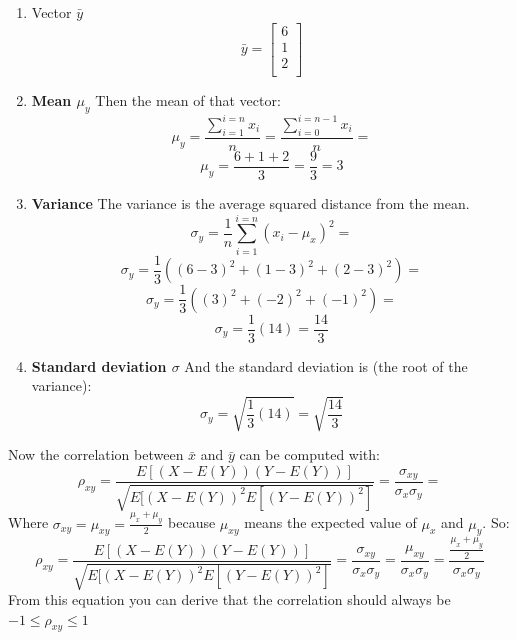 \begin{enumerate}
    \item Vector $\bar{y}$
        \begin{equation}
            \bar{y}=
            \begin{bmatrix}
            6\\
            1\\
            2\\
            \end{bmatrix}
        \end{equation}
    \item \textbf{Mean $\mu_y$}
        Then the mean of that vector:
        \begin{equation}
            \mu_y =\frac{\sum_{i=1}^{i=n}{x_i}}{n}= \frac{\sum_{i=0}^{i=n-1}{x_i}}{n}=
        \end{equation}
        \begin{equation}
            \mu_y=\frac{6+1+2}{3}=\frac{9}{3}=3
        \end{equation}
    \item \textbf{Variance}
        The variance is the average squared distance from the mean.
        \begin{equation}
            \sigma_y=\frac{1}{n}\sum_{i=1}^{i=n}{({x_i}-\mu_x)}^2=
        \end{equation}
        \begin{equation}
            \sigma_y=\frac{1}{3}({(6-3)}^2+{(1-3)}^2+{(2-3)}^2)=
        \end{equation}
        \begin{equation}
            \sigma_y=\frac{1}{3}({(3)}^2+{(-2)}^2+{(-1)}^2)=
        \end{equation}
        \begin{equation}
            \sigma_y=\frac{1}{3}(14)=\frac{14}{3}
        \end{equation}
    \item \textbf{Standard deviation $\sigma$}
        And the standard deviation is (the root of the variance):
        \begin{equation}
            \sigma_y=\sqrt{\frac{1}{3}(14)}=\sqrt{\frac{14}{3}}
        \end{equation}
\end{enumerate}
Now the correlation between $\bar{x}$ and $\bar{y}$ can be computed with:
\begin{equation}
    \rho_{xy}=\frac{E[(X-E(Y))(Y-E(Y))]}{\sqrt{E{[{(X-E(Y))}^2E[{(Y-E(Y))}^2]}}}=\frac{\sigma_{xy}}{\sigma_x\sigma_y}=
\end{equation}
Where $\sigma_{xy}=\mu_{xy}=\frac{\mu_x+\mu_y}{2}$ because $\mu_{xy}$ means the expected value of $\mu_x$ and $\mu_y$. So:
\begin{equation}
    \rho_{xy}=\frac{E[(X-E(Y))(Y-E(Y))]}{\sqrt{E{[{(X-E(Y))}^2E[{(Y-E(Y))}^2]}}}=\frac{\sigma_{xy}}{\sigma_x\sigma_y}=\frac{\mu_{xy}}{\sigma_x\sigma_y}=\frac{\frac{\mu_x+\mu_y}{2}}{\sigma_x\sigma_y}
\end{equation}
From this equation you can derive that the correlation should always be $-1\leq \rho_{xy} \leq 1$

